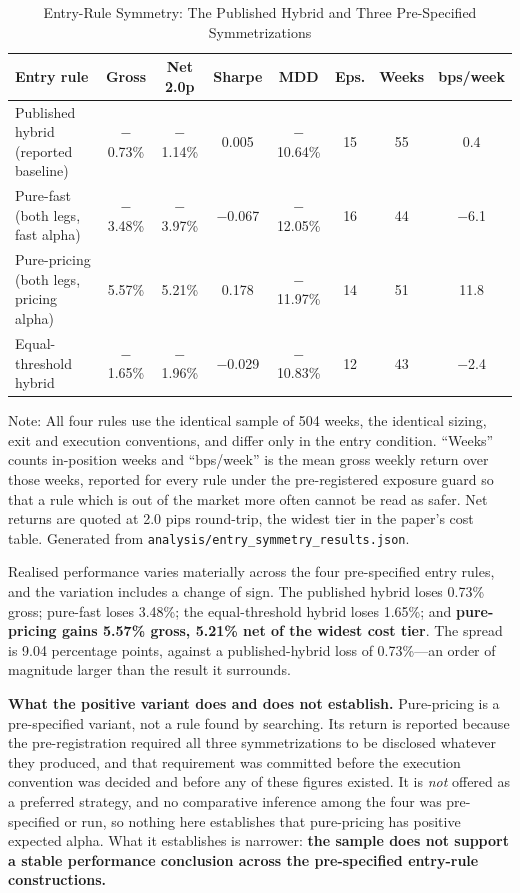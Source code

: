 \documentclass[11pt]{article}
\begin{document}
\begin{table}[H]
\centering
\caption{Entry-Rule Symmetry: The Published Hybrid and Three Pre-Specified Symmetrizations}
\label{tab:entrysymmetry}
\footnotesize
\begin{tabular}{@{}lccccccc@{}}
\toprule
Entry rule & Gross & Net 2.0p & Sharpe & MDD & Eps. & Weeks & bps/week \\
\midrule
Published hybrid (reported baseline) & $-$0.73\% & $-$1.14\% & 0.005 & $-$10.64\% & 15 & 55 & 0.4 \\
Pure-fast (both legs, fast alpha) & $-$3.48\% & $-$3.97\% & $-$0.067 & $-$12.05\% & 16 & 44 & $-$6.1 \\
Pure-pricing (both legs, pricing alpha) & 5.57\% & 5.21\% & 0.178 & $-$11.97\% & 14 & 51 & 11.8 \\
Equal-threshold hybrid & $-$1.65\% & $-$1.96\% & $-$0.029 & $-$10.83\% & 12 & 43 & $-$2.4 \\
\bottomrule
\end{tabular}
\par\vspace{0.3em}
\parbox{\linewidth}{\footnotesize Note: All four rules use the identical sample of 504 weeks, the identical sizing, exit and execution conventions, and differ only in the entry condition. ``Weeks'' counts in-position weeks and ``bps/week'' is the mean gross weekly return over those weeks, reported for every rule under the pre-registered exposure guard so that a rule which is out of the market more often cannot be read as safer. Net returns are quoted at 2.0 pips round-trip, the widest tier in the paper's cost table. Generated from \texttt{analysis/entry\_symmetry\_results.json}.}
\end{table}

Realised performance varies materially across the four pre-specified entry rules, and the variation includes a change of sign. The published hybrid loses 0.73\% gross; pure-fast loses 3.48\%; the equal-threshold hybrid loses 1.65\%; and \textbf{pure-pricing gains 5.57\% gross, 5.21\% net of the widest cost tier}. The spread is 9.04 percentage points, against a published-hybrid loss of 0.73\%---an order of magnitude larger than the result it surrounds.

\textbf{What the positive variant does and does not establish.} Pure-pricing is a pre-specified variant, not a rule found by searching. Its return is reported because the pre-registration required all three symmetrizations to be disclosed whatever they produced, and that requirement was committed before the execution convention was decided and before any of these figures existed. It is \emph{not} offered as a preferred strategy, and no comparative inference among the four was pre-specified or run, so nothing here establishes that pure-pricing has positive expected alpha. What it establishes is narrower: \textbf{the sample does not support a stable performance conclusion across the pre-specified entry-rule constructions.}
\end{document}

